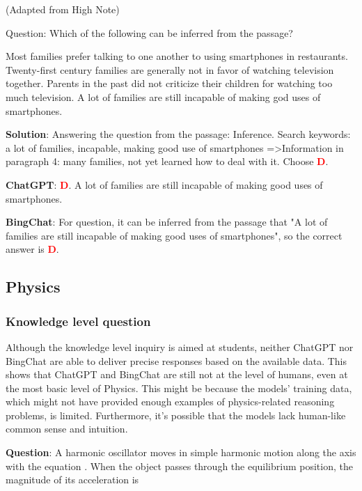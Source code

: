 \documentclass{article}
\begin{document}
{\begin{mdframed}[linewidth=1pt,linecolor=red]
		(Adapted from High Note)
		
		Question: Which of the following can be inferred from the passage?
		\begin{choices}
			\choice Most families prefer talking to one another to using smartphones in restaurants.
			\choice Twenty-first century families are generally not in favor of watching television together.
			\choice Parents in the past did not criticize their children for watching too much television.
			\choice A lot of families are still incapable of making god uses of smartphones.
		\end{choices}
		
		\textbf{Solution}: Answering the question from the passage: Inference. Search keywords: a lot of families, incapable, making good use of smartphones =>Information in paragraph 4: many families, not yet learned how to deal with it. Choose \textcolor{red}{\textbf{D}}. 
		
		\textbf{ChatGPT}: \textcolor{red}{\textbf{D}}. A lot of families are still incapable of making good uses of smartphones.  
		
		\textbf{BingChat}: For question, it can be inferred from the passage that "A lot of families are still incapable of making good uses of smartphones", so the correct answer is \textcolor{red}{\textbf{D}}.
		
	\end{mdframed}
	
	\subsection{Physics}
	\label{VNHSGE_Phy}
	
	\subsubsection{Knowledge level question}
	\label{VNHSGE_Phy_K}
	
	Although the knowledge level inquiry is aimed at students, neither ChatGPT nor BingChat are able to deliver precise responses based on the available data. This shows that ChatGPT and BingChat are still not at the level of humans, even at the most basic level of Physics. This might be because the models' training data, which might not have provided enough examples of physics-related reasoning problems, is limited. Furthermore, it's possible that the models lack human-like common sense and intuition.
	
	\begin{mdframed}[linewidth=1pt,linecolor=red] \textbf{Question}: A harmonic oscillator moves in simple harmonic motion along the  axis with the equation . When the object passes through the equilibrium position, the magnitude of its acceleration is 
		

\end{mdframed}}
\end{document}
